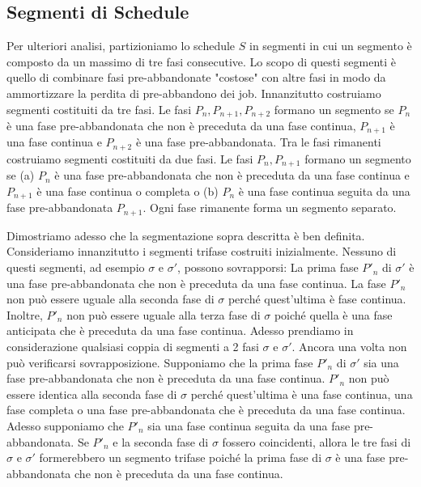 \documentclass[12pt]{article}
\begin{document}
\subsection{Segmenti di Schedule}
Per ulteriori analisi, partizioniamo lo schedule $S$ in segmenti in cui un segmento è composto da un massimo di tre fasi consecutive. Lo scopo di questi segmenti è quello di combinare fasi pre-abbandonate "costose" con altre fasi in modo da ammortizzare la perdita di pre-abbandono dei job. Innanzitutto costruiamo segmenti costituiti da tre fasi. Le fasi $P_{n}, P_{n + 1}, P_{n + 2}$ formano un segmento se $P_{n}$ è una fase pre-abbandonata che non è preceduta da una fase continua, $P_{n + 1}$ è una fase continua e $P_{n + 2}$ è una fase pre-abbandonata. Tra le fasi rimanenti costruiamo segmenti costituiti da due fasi. Le fasi $P_{n}, P_{n + 1}$ formano un segmento se (a) $P_{n}$ è una fase pre-abbandonata che non è preceduta da una fase continua e $P_{n + 1}$ è una fase continua o completa o (b) $P_{n}$ è una fase continua seguita da una fase pre-abbandonata $P_{n + 1}$. Ogni fase rimanente forma un segmento separato. 

Dimostriamo adesso che la segmentazione sopra descritta è ben definita. Consideriamo innanzitutto i segmenti trifase costruiti inizialmente. Nessuno di questi segmenti, ad esempio $\sigma$ e $\sigma'$, possono sovrapporsi: La prima fase $P'_{n}$ di $\sigma'$ è una fase pre-abbandonata che non è preceduta da una fase continua. La fase $P'_{n}$ non può essere uguale alla seconda fase di $\sigma$ perché quest'ultima è fase continua. Inoltre, $P'_{n}$ non può essere uguale alla terza fase di $\sigma$ poiché quella è una fase anticipata che è preceduta da una fase continua. Adesso prendiamo in considerazione qualsiasi coppia di segmenti a 2 fasi $\sigma$ e $\sigma'$. Ancora una volta non può verificarsi sovrapposizione. Supponiamo che la prima fase $P'_{n}$ di $\sigma'$ sia una fase pre-abbandonata che non è preceduta da una fase continua. $P'_{n}$ non può essere identica alla seconda fase di $\sigma$ perché quest'ultima è una fase continua, una fase completa o una fase pre-abbandonata che è preceduta da una fase continua. Adesso supponiamo che $P'_{n}$ sia una fase continua seguita da una fase pre-abbandonata. Se $P'_{n}$ e la seconda fase di $\sigma$ fossero coincidenti, allora le tre fasi di $\sigma$ e $\sigma'$ formerebbero un segmento trifase poiché la prima fase di $\sigma$ è una fase pre-abbandonata che non è preceduta da una fase continua.
\end{document}
